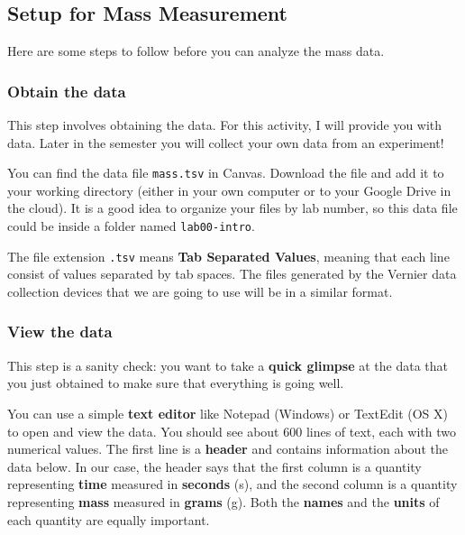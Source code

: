 \subsection{Setup for Mass Measurement}
Here are some steps to follow before you can analyze the mass data.
\subsubsection{Obtain the data}
This step involves obtaining the data. For this activity, I will provide you with data. Later in the semester you will collect your own data from an experiment!

You can find the data file \texttt{mass.tsv} in Canvas. Download the file and add it to your working directory (either in your own computer or to your Google Drive in the cloud). It is a good idea to organize your files by lab number, so this data file could be inside a folder named \texttt{lab00-intro}.

The file extension \texttt{.tsv} means \textbf{Tab Separated Values}, meaning that each line consist of values separated by tab spaces. The files generated by the Vernier data collection devices that we are going to use will be in a similar format.
\subsubsection{View the data}
This step is a sanity check: you want to take a \textbf{quick glimpse} at the data that you just obtained to make sure that everything is going well.

You can use a simple \textbf{text editor} like Notepad (Windows) or TextEdit (OS X) to open and view the data. You should see about 600 lines of text, each with two numerical values. The first line is a \textbf{header} and contains information about the data below. In our case, the header says that the first column is a quantity representing \textbf{time} measured in \textbf{seconds} (s), and the second column is a quantity representing \textbf{mass} measured in \textbf{grams} (g). Both the \textbf{names} and the \textbf{units} of each quantity are equally important.

